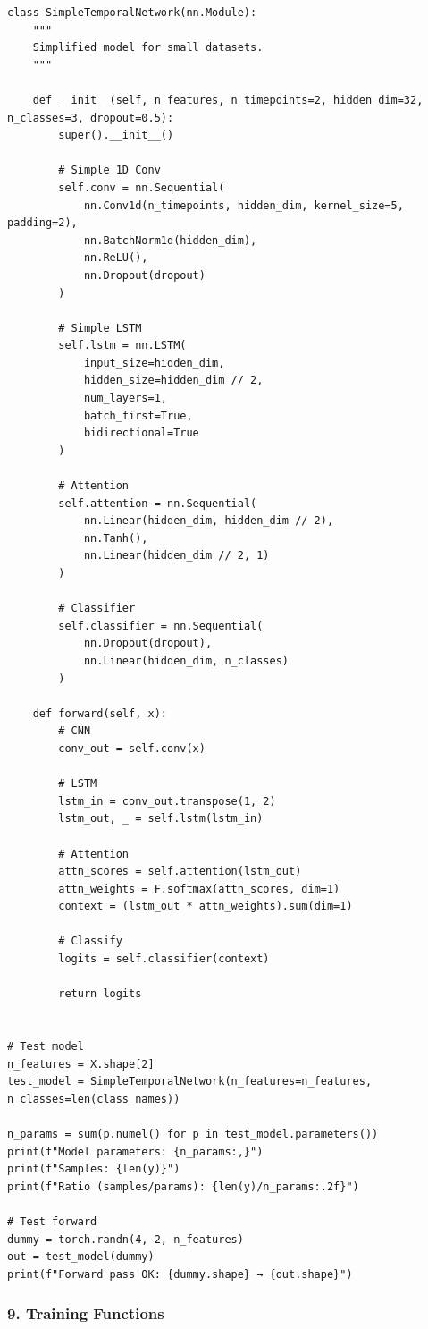 \begin{lstlisting}
class SimpleTemporalNetwork(nn.Module):
    """
    Simplified model for small datasets.
    """
 
    def __init__(self, n_features, n_timepoints=2, hidden_dim=32, n_classes=3, dropout=0.5):
        super().__init__()
 
        # Simple 1D Conv
        self.conv = nn.Sequential(
            nn.Conv1d(n_timepoints, hidden_dim, kernel_size=5, padding=2),
            nn.BatchNorm1d(hidden_dim),
            nn.ReLU(),
            nn.Dropout(dropout)
        )
 
        # Simple LSTM
        self.lstm = nn.LSTM(
            input_size=hidden_dim,
            hidden_size=hidden_dim // 2,
            num_layers=1,
            batch_first=True,
            bidirectional=True
        )
 
        # Attention
        self.attention = nn.Sequential(
            nn.Linear(hidden_dim, hidden_dim // 2),
            nn.Tanh(),
            nn.Linear(hidden_dim // 2, 1)
        )
 
        # Classifier
        self.classifier = nn.Sequential(
            nn.Dropout(dropout),
            nn.Linear(hidden_dim, n_classes)
        )
 
    def forward(self, x):
        # CNN
        conv_out = self.conv(x)
 
        # LSTM
        lstm_in = conv_out.transpose(1, 2)
        lstm_out, _ = self.lstm(lstm_in)
 
        # Attention
        attn_scores = self.attention(lstm_out)
        attn_weights = F.softmax(attn_scores, dim=1)
        context = (lstm_out * attn_weights).sum(dim=1)
 
        # Classify
        logits = self.classifier(context)
 
        return logits
 
 
# Test model
n_features = X.shape[2]
test_model = SimpleTemporalNetwork(n_features=n_features, n_classes=len(class_names))
 
n_params = sum(p.numel() for p in test_model.parameters())
print(f"Model parameters: {n_params:,}")
print(f"Samples: {len(y)}")
print(f"Ratio (samples/params): {len(y)/n_params:.2f}")
 
# Test forward
dummy = torch.randn(4, 2, n_features)
out = test_model(dummy)
print(f"Forward pass OK: {dummy.shape} → {out.shape}")
\end{lstlisting}
 
\subsubsection*{9. Training Functions}
 
